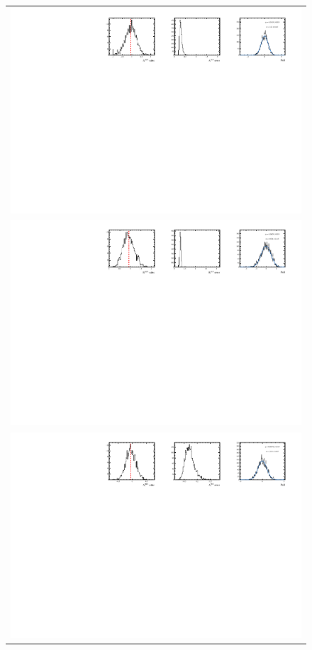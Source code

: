 \begin{figure}
  \centering
  \begin{tabular}{c}
\includegraphics[width=\textwidth]{ANA_resources/Plots/Data_fit/FitterBias//A_signal_pipi_run1.pdf} \\
\includegraphics[width=\textwidth]{ANA_resources/Plots/Data_fit/FitterBias//R_signal_pipi_run1.pdf} \\
\includegraphics[width=\textwidth]{ANA_resources/Plots/Data_fit/FitterBias//A_Bs_pipi_run1.pdf} \\

\end{tabular}
\end{figure}
